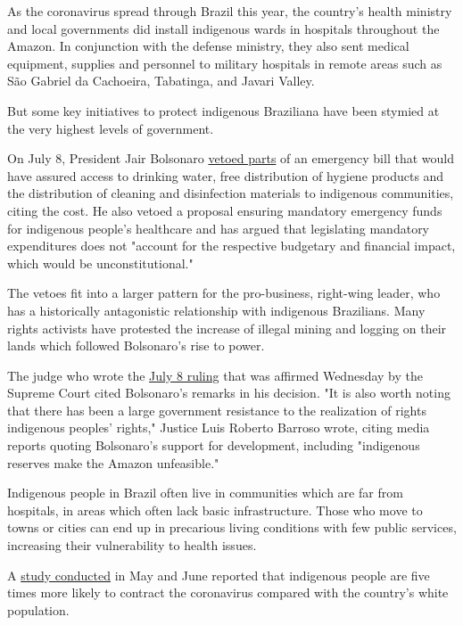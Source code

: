 As the coronavirus spread through Brazil this year, the country's health
ministry and local governments did install indigenous wards in hospitals
throughout the Amazon. In conjunction with the defense ministry, they
also sent medical equipment, supplies and personnel to military
hospitals in remote areas such as São Gabriel da Cachoeira, Tabatinga,
and Javari Valley.

But some key initiatives to protect indigenous Braziliana have been
stymied at the very highest levels of government.

On July 8, President Jair Bolsonaro
\href{https://www.cnn.com/2020/07/08/americas/brazil-jair-bolsonaro-coronavirus-intl/index.html}{vetoed
parts} of an emergency bill that would have assured access to drinking
water, free distribution of hygiene products and the distribution of
cleaning and disinfection materials to indigenous communities, citing
the cost. He also vetoed a proposal ensuring mandatory emergency funds
for indigenous people's healthcare and has argued that legislating
mandatory expenditures does not "account for the respective budgetary
and financial impact, which would be unconstitutional."

The vetoes fit into a larger pattern for the pro-business, right-wing
leader, who has a historically antagonistic relationship with indigenous
Brazilians. Many rights activists have protested the increase of illegal
mining and logging on their lands which followed Bolsonaro's rise to
power.

The judge who wrote the
\href{http://www.stf.jus.br/arquivo/cms/noticiaNoticiaStf/anexo/adpf709.pdf}{July
8 ruling} that was affirmed Wednesday by the Supreme Court cited
Bolsonaro's remarks in his decision. "It is also worth noting that there
has been a large government resistance to the realization of rights
indigenous peoples' rights," Justice Luis Roberto Barroso wrote, citing
media reports quoting Bolsonaro's support for development, including
"indigenous reserves make the Amazon unfeasible."

Indigenous people in Brazil often live in communities which are far from
hospitals, in areas which often lack basic infrastructure. Those who
move to towns or cities can end up in precarious living conditions with
few public services, increasing their vulnerability to health issues.

A
\href{https://www.medrxiv.org/content/10.1101/2020.05.30.20117531v1}{study
conducted} in May and June reported that indigenous people are five
times more likely to contract the coronavirus compared with the
country's white population.

